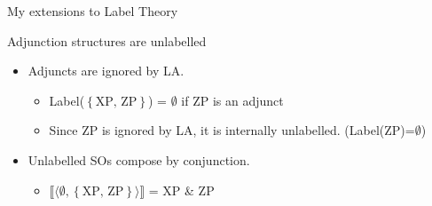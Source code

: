 \documentclass[Proposal]{subfiles}
\begin{document}
\begin{frame}
  {My extensions to Label Theory}
  \begin{block}
    {Adjunction structures are unlabelled \parencite[\textit{cf.}][]{chametzky1996theory}}
    \begin{itemize}
      \item Adjuncts are ignored by LA.
	\begin{itemize}
	  \item Label($\left\{ \text{XP, ZP} \right\}$) = $\emptyset$ if ZP is an adjunct
	  \item Since ZP is ignored by LA, it is internally unlabelled. (Label(ZP)=$\emptyset$)
	\end{itemize}
	\pause
      \item Unlabelled SOs compose by conjunction.
	\begin{itemize}
	  \item $\llbracket\langle \emptyset, \left\{ \text{XP, ZP} \right\}\rangle\rrbracket$ = XP \& ZP 
	\end{itemize}
    \end{itemize}
  \end{block}
\end{frame}

\end{document}
